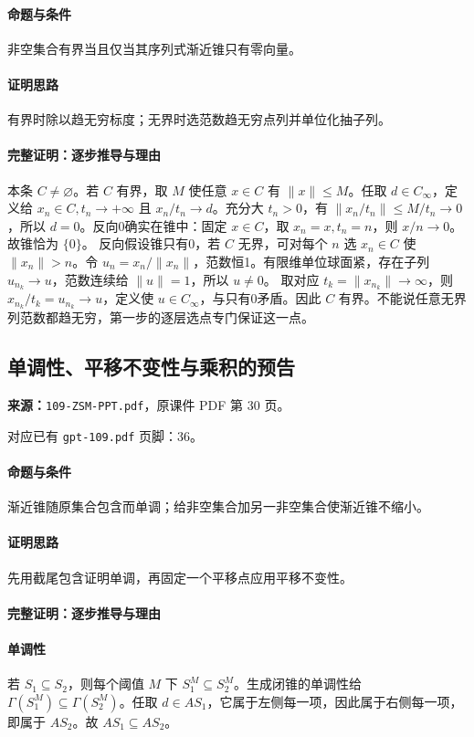 \paragraph{命题与条件}非空集合有界当且仅当其序列式渐近锥只有零向量。
\paragraph{证明思路}有界时除以趋无穷标度；无界时选范数趋无穷点列并单位化抽子列。
\paragraph{完整证明：逐步推导与理由}

本条 $C\ne\varnothing$。若 $C$ 有界，取 $M$ 使任意 $x\in C$ 有 $\|x\|\le M$。任取 $d\in C_\infty$，定义给 $x_n\in C,t_n\to+\infty$ 且 $x_n/t_n\to d$。充分大 $t_n>0$，有 $\|x_n/t_n\|\le M/t_n\to0$，所以 $d=0$。反向0确实在锥中：固定 $x\in C$，取 $x_n=x,t_n=n$，则 $x/n\to0$。故锥恰为 $\{0\}$。
反向假设锥只有0，若 $C$ 无界，可对每个 $n$ 选 $x_n\in C$ 使 $\|x_n\|>n$。令 $u_n=x_n/\|x_n\|$，范数恒1。有限维单位球面紧，存在子列 $u_{n_k}\to u$，范数连续给 $\|u\|=1$，所以 $u\ne0$。
取对应 $t_k=\|x_{n_k}\|\to\infty$，则 $x_{n_k}/t_k=u_{n_k}\to u$，定义使 $u\in C_\infty$，与只有0矛盾。因此 $C$ 有界。不能说任意无界列范数都趋无穷，第一步的逐层选点专门保证这一点。

\clearpage\subsection{单调性、平移不变性与乘积的预告}
\textbf{来源：}\texttt{109-ZSM-PPT.pdf}，原课件 PDF 第 30 页。\par
对应已有 \texttt{gpt-109.pdf} 页脚：36。\par
\paragraph{命题与条件}渐近锥随原集合包含而单调；给非空集合加另一非空集合使渐近锥不缩小。
\paragraph{证明思路}先用截尾包含证明单调，再固定一个平移点应用平移不变性。
\paragraph{完整证明：逐步推导与理由}

\paragraph{单调性}若 $S_1\subseteq S_2$，则每个阈值 $M$ 下 $S_1^M\subseteq S_2^M$。生成闭锥的单调性给 $\Gamma(S_1^M)\subseteq\Gamma(S_2^M)$。任取 $d\in AS_1$，它属于左侧每一项，因此属于右侧每一项，即属于 $AS_2$。故 $AS_1\subseteq AS_2$。
